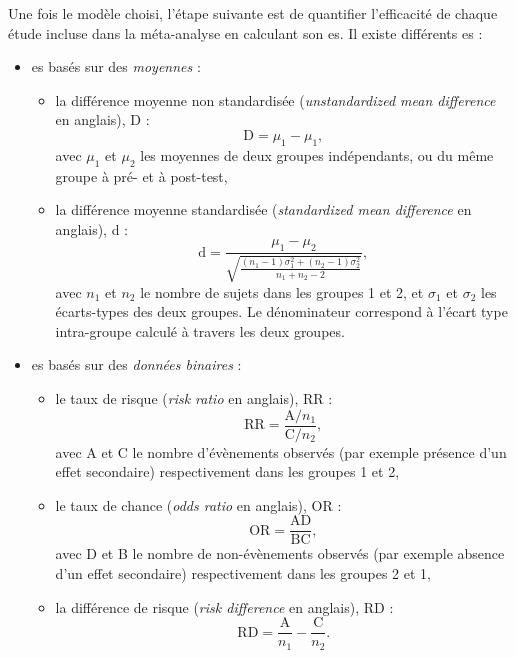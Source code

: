 Une fois le modèle choisi, l'étape suivante est de quantifier l'efficacité de chaque étude incluse dans la méta-analyse en calculant son \gls{es}. 
Il existe différents \gls{es} \citep[Chapitre~3]{Borenstein2009} :
\renewcommand{\labelitemi}{$\bullet$}
\renewcommand{\labelitemii}{$\cdot$}
\begin{itemize}
\item \gls{es} basés sur des \emph{moyennes} :
\begin{itemize}
    \item la différence moyenne non standardisée (\textit{unstandardized mean difference} en anglais), D :
		    \begin{equation}
        \label{eq:metareview_unstandardized_mean_difference}
        \text{D} = \mu_{1} - \mu_{1},
        \end{equation} 
		avec $\mu_{1}$ et $\mu_{2}$ les moyennes de deux groupes indépendants, ou du même groupe à pré- et à post-test,
    \item la différence moyenne standardisée (\textit{standardized mean difference} en anglais), d :
		    \begin{equation}
        \label{eq:metareview_standardized_mean_difference}
        \text{d} = \frac{\mu_{1} - \mu_{2}}{\sqrt{\frac{(n_1 - 1)\sigma_1^2 + (n_2 - 1)\sigma_2^2} {n_1 + n_2 - 2}}},
        \end{equation} 
		avec $n_{1}$ et $n_{2}$ le nombre de sujets dans les groupes 1 et 2, et $\sigma_{1}$ et $\sigma_{2}$ les écarts-types des deux groupes. Le dénominateur
		correspond à l'écart type intra-groupe calculé à travers les deux groupes.
\end{itemize}
\item \gls{es} basés sur des \emph{données binaires} :
\begin{itemize}
    \item le taux de risque (\textit{risk ratio} en anglais), RR :
				\begin{equation}
        \label{eq:metareview_risk_ratio}
        \text{RR} = \frac{ \text{A} / n_1 } { \text{C} / n_2 },
        \end{equation} 
		avec A et C le nombre d'évènements observés (par exemple présence d'un effet secondaire) respectivement dans les groupes 1 et 2,
    \item le taux de chance (\textit{odds ratio} en anglais), OR :
				\begin{equation}
        \label{eq:metareview_odds_ratio}
        \text{OR} = \frac{ \text{AD} } { \text{BC} },
        \end{equation} 		
		avec D et B le nombre de non-évènements observés (par exemple absence d'un effet secondaire) respectivement dans les groupes 2 et 1,
		\item la différence de risque (\textit{risk difference} en anglais), RD :
				\begin{equation}
        \label{eq:metareview_risk_difference}
        \text{RD} = \frac{ \text{A} } { n_1 } - \frac{ \text{C} } { n_2 }.
        \end{equation}
\end{itemize}
\end{itemize}

